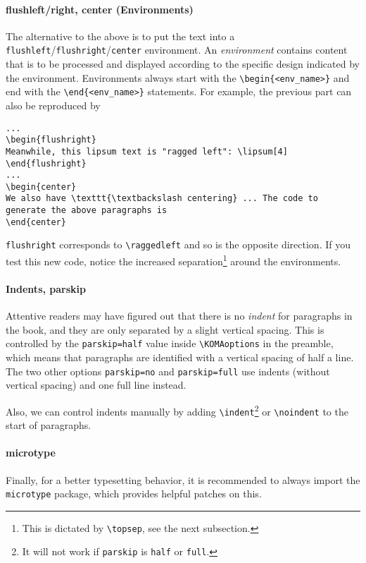 \paragraph{flushleft/right, center (Environments)}
The alternative to the above is to put the text into a \verb|flushleft|/\verb|flushright|/\verb|center| environment. An \textit{environment} contains content that is to be processed and displayed according to the specific design indicated by the environment. Environments always start with the \texttt{\textbackslash begin\{<env\_name>\}} and end with the \texttt{\textbackslash end\{<env\_name>\}} statements. For example, the previous part can also be reproduced by
\begin{lstlisting}
...
\begin{flushright}
Meanwhile, this lipsum text is "ragged left": \lipsum[4]
\end{flushright}
...
\begin{center}
We also have \texttt{\textbackslash centering} ... The code to generate the above paragraphs is
\end{center}
\end{lstlisting}
\texttt{flushright} corresponds to \texttt{\textbackslash raggedleft} and so is the opposite direction. If you test this new code, notice the increased separation\footnote{This is dictated by \texttt{\textbackslash topsep}, see the next subsection.} around the environments. 

\paragraph{Indents, parskip}
Attentive readers may have figured out that there is no \textit{indent} for paragraphs in the book, and they are only separated by a slight vertical spacing. This is controlled by the \verb|parskip=half| value inside \texttt{\textbackslash KOMAoptions} in the preamble, which means that paragraphs are identified with a vertical spacing of half a line. The two other options \verb|parskip=no| and \verb|parskip=full| use indents (without vertical spacing) and one full line instead. 

Also, we can control indents manually by adding \texttt{\textbackslash indent}\footnote{It will not work if \texttt{parskip} is \texttt{half} or \texttt{full}.} or \texttt{\textbackslash noindent} to the start of paragraphs.

\paragraph{microtype}
Finally, for a better typesetting behavior, it is recommended to always import the \verb|microtype| package, which provides helpful patches on this.

